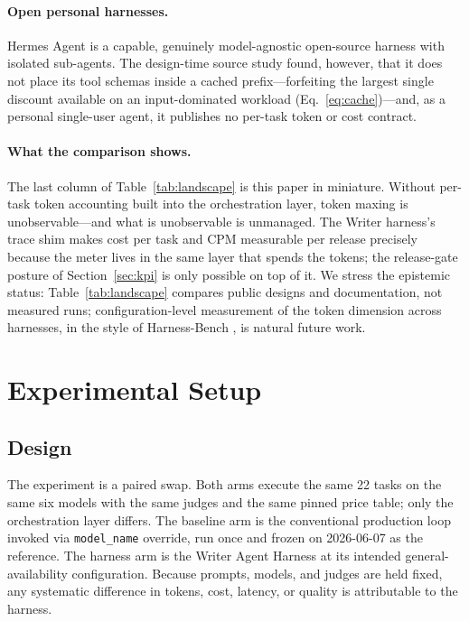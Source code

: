 \documentclass[11pt]{article}
\newcommand{\NP}{22}                    %
\newcommand{\NM}{six}                   %
\newcommand{\FreezeDate}{2026-06-07}
\begin{document}
\paragraph{Open personal harnesses.} Hermes Agent \cite{hermes} is a capable, genuinely model-agnostic open-source harness with isolated sub-agents. The design-time source study found, however, that it does not place its tool schemas inside a cached prefix---forfeiting the largest single discount available on an input-dominated workload (Eq.~\eqref{eq:cache})---and, as a personal single-user agent, it publishes no per-task token or cost contract.

\paragraph{What the comparison shows.} The last column of Table~\ref{tab:landscape} is this paper in miniature. Without per-task token accounting built into the orchestration layer, token maxing is unobservable---and what is unobservable is unmanaged. The Writer harness's trace shim makes cost per task and CPM measurable per release precisely because the meter lives in the same layer that spends the tokens; the release-gate posture of Section~\ref{sec:kpi} is only possible on top of it. We stress the epistemic status: Table~\ref{tab:landscape} compares public designs and documentation, not measured runs; configuration-level measurement of the token dimension across harnesses, in the style of Harness-Bench \cite{harnessbench}, is natural future work.

\section{Experimental Setup}
\label{sec:setup}

\subsection{Design}

The experiment is a paired swap. Both arms execute the same \NP{} tasks on the same \NM{} models with the same judges and the same pinned price table; only the orchestration layer differs. The baseline arm is the conventional production loop invoked via \texttt{model\_name} override, run once and frozen on \FreezeDate{} as the reference. The harness arm is the Writer Agent Harness at its intended general-availability configuration. Because prompts, models, and judges are held fixed, any systematic difference in tokens, cost, latency, or quality is attributable to the harness.
\end{document}
